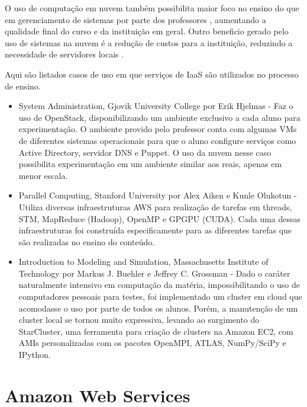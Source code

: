 \documentclass[tg]{mdtufsm}
\begin{document}
O uso de computação em nuvem também possibilita maior foco no ensino do que em gerenciamento de sistemas por parte dos professores \cite{cloudedu}, aumentando a qualidade final do curso e da instituição em geral. Outro beneficio gerado pelo uso de sistemas na nuvem é a redução de custos para a instituição, reduzindo a necessidade de servidores locais \cite{toutcloud}.

Aqui são listados casos de uso em que serviços de IaaS são utilizados no processo de ensino.

\begin{itemize}
\item System Administration, Gjovik University College por Erik Hjelmas \cite{erik} - Faz o uso de OpenStack, disponibilizando um ambiente exclusivo a cada aluno para experimentação. O ambiente provido pelo professor conta com algumas VMs de diferentes sistemas operacionais para que o aluno configure serviços como Active Directory, servidor DNS e Puppet. O uso da nuvem nesse caso possibilita experimentação em um ambiente similar aos reais, apenas em menor escala.

\item Parallel Computing, Stanford University por Alex Aiken e Kunle Olukotun \cite{stanford} - Utiliza diversas infraestruturas AWS para realização de tarefas em threads, STM, MapReduce (Hadoop), OpenMP e GPGPU (CUDA). Cada uma dessas infraestruturas foi construída especificamente para as diferentes tarefas que são realizadas no ensino do conteúdo.

\item Introduction to Modeling and Simulation, Massachusetts Institute of Technology por Markus J. Buehler e Jeffrey C. Grossman  \cite{starclusterMIT} - Dado o caráter naturalmente intensivo em computação da matéria, impossibilitando o uso de computadores pessoais para testes, foi implementado um cluster em cloud que acomodasse o uso por parte de todos os alunos. Porém, a manutenção de um cluster local se tornou muito expressiva, levando ao surgimento do StarCluster, uma ferramenta para criação de clusters na Amazon EC2, com AMIs personalizadas com os pacotes OpenMPI, ATLAS, NumPy/SciPy e IPython.
\end{itemize}

\section{Amazon Web Services}
\end{document}
